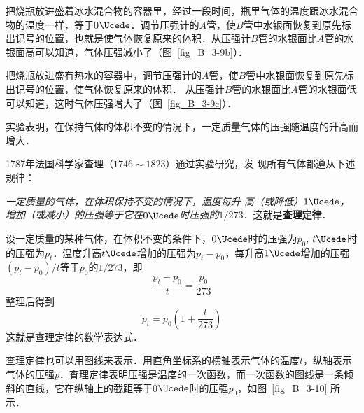 把烧瓶放进盛着冰水混合物的容器里，经过一段时间，瓶里气体的温度跟冰水混合物的温度一样，等于0$\Ucede$．调节压强计的$A$管，使$B$管中水银面恢复到原先标出记号的位置，也就是使气体恢复原来的体积．从压强计$B$管的水银面比$A$管的水银面高可以知道，气体压强减小了（图~\ref{fig_B_3-9b}）．

把烧瓶放进盛有热水的容器中，调节压强计的$A$管，使$B$管中水银面恢复到原先标出记号的位置，使气体恢复原来的体积．
从压强计$B$管的水银面比$A$管的水银面低可以知道，这时气体压强增大了（图~\ref{fig_B_3-9c}）．

实验表明，在保持气体的体积不变的情况下，一定质量气体的压强随温度的升高而增大．

1787年法国科学家查理（$1746 \sim 1823$）通过实验研究，发
现所有气体都遵从下述规律：

\textit{一定质量的气体，在体积保持不变的情况下，温度每升
高（或降低）$1 \Ucede $，增加（或减小）的压强等于它在$0 \Ucede $时压强的$1/273$．}这就是\textbf{查理定律}．

设一定质量的某种气体，在体积不变的条件下，$0 \Ucede $时的压强为$p_0$, $t \Ucede $时的压强为$p_t$．温度升高$t \Ucede $增加的压强为$p_t-p_0$，每升高$1 \Ucede$增加的压强$(p_t-p_0)/t$等于$p_0$的$1/273$，即
\[\frac{p_t-p_0}{t}=\frac{p_0}{273} \]
整理后得到
\[p_t=p_0 \left(1+\frac{t}{273}\right)\]
这就是查理定律的数学表达式．

查理定律也可以用图线来表示．用直角坐标系的横轴表示气体的温度$t$，纵轴表示气体的压强$p$．査理定律表明压强是温度的一次函数，而一次函数的图线是一条倾斜的直线，它在纵轴上的截距等于0$\Ucede$时的压强$p_0$，如图~\ref{fig_B_3-10} 所示．


